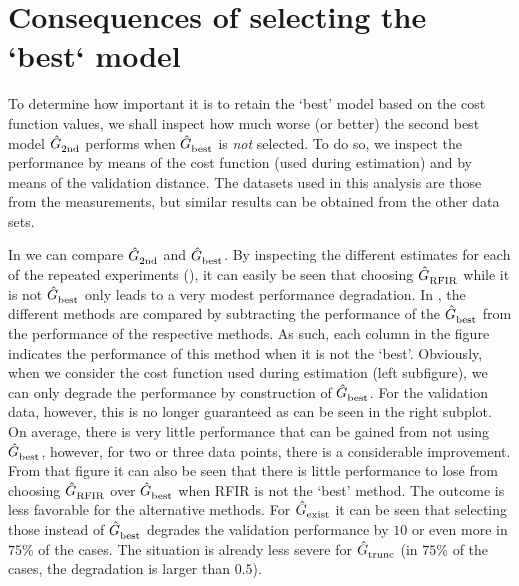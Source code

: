 \section{Consequences of selecting the `best` model}
To determine how important it is to retain the `best' model based on the cost function values, we shall inspect how much worse (or better) the second best model $\hat{G}_{\mathrm{2nd}}^{\mathrm{}}$ performs when $\hat{G}_{\mathrm{best}}^{\mathrm{}}$ is \emph{not} selected.
To do so, we inspect the performance by means of the cost function (used during estimation) and by means of the validation distance.
The datasets used in this analysis are those from the measurements, but similar results can be obtained from the other data sets.

In  we can compare $\hat{G}_{\mathrm{2nd}}^{\mathrm{}}$ and $\hat{G}_{\mathrm{best}}^{\mathrm{}}$.
By inspecting the different estimates for  each of the repeated experiments (), it can easily be seen that choosing $\hat{G}_{\mathrm{RFIR}}^{\mathrm{}}$ while it is not $\hat{G}_{\mathrm{best}}^{\mathrm{}}$ only leads to a very modest performance degradation.
In , the different methods are compared by subtracting the performance of the $\hat{G}_{\mathrm{best}}^{\mathrm{}}$ from the performance of the respective methods.
As such, each column in the figure indicates the performance of this method when it is not the `best'.
Obviously, when we consider the cost function used during estimation (left subfigure), we can only degrade the performance by construction of $\hat{G}_{\mathrm{best}}^{\mathrm{}}$.
For the validation data, however, this is no longer guaranteed as can be seen in the right subplot.
On average, there is very little performance that can be gained from not using $\hat{G}_{\mathrm{best}}^{\mathrm{}}$, however, for two or three data points, there is a considerable improvement.
From that figure it can also be seen that there is little performance to lose from choosing $\hat{G}_{\mathrm{RFIR}}^{\mathrm{}}$ over $\hat{G}_{\mathrm{best}}^{\mathrm{}}$ when RFIR is not the `best' method.
The outcome is less favorable for the alternative methods.
For $\hat{G}_{\mathrm{exist}}^{\mathrm{}}$ it can be seen that selecting those instead of $\hat{G}_{\mathrm{best}}^{\mathrm{}}$  degrades the validation performance by $10$ or even more in $75\%$ of the cases.
The situation is already less severe for $\hat{G}_{\mathrm{trunc}}^{\mathrm{}}$ (in $75\%$ of the cases, the degradation is larger than $0.5$).

